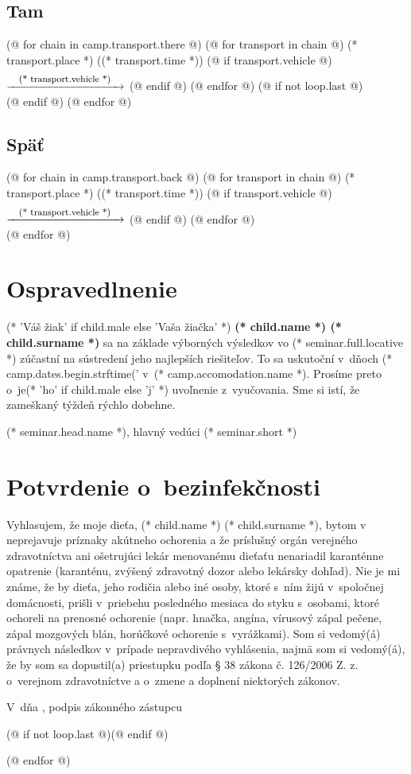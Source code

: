 \documentclass[12pt, twoside]{article}
\begin{document}
        \subsection{Tam}
        (@ for chain in camp.transport.there @)
            (@ for transport in chain @)
            (* transport.place *) ((* transport.time *)) (@ if transport.vehicle @) \quad$\xrightarrow{\raisebox{-4mm}{\footnotesize\text{\quad (* transport.vehicle *)\quad}}}$ \quad(@ endif @)
            (@ endfor @)%
            (@ if not loop.last @)\\(@ endif @)
        (@ endfor @)
        \subsection{Späť}
        (@ for chain in camp.transport.back @)
            (@ for transport in chain @)
            (* transport.place *) ((* transport.time *)) (@ if transport.vehicle @) \quad$\xrightarrow{\raisebox{-4mm}{\footnotesize\text{\quad (* transport.vehicle *)\quad}}}$ \quad(@ endif @)
            (@ endfor @)\\
        (@ endfor @)

    \cutHere
    \section{Ospravedlnenie}
        (* 'Váš žiak' if child.male else 'Vaša žiačka' *) \textbf{(* child.name *) (* child.surname *)} sa na základe výborných výsledkov vo (* seminar.full.locative *)
        zúčastní na sústredení jeho najlepších riešiteľov. To sa uskutoční v~dňoch (* camp.dates.begin.strftime('%
        v~(* camp.accomodation.name *). Prosíme preto o~je(* 'ho' if child.male else 'j' *) uvoľnenie z~vyučovania.
        Sme si istí, že zameškaný týždeň rýchlo dobehne.
        \vspace{5mm}

        \hfill (* seminar.head.name *), hlavný vedúci (* seminar.short *)
    
    \cutHere
    \section{Potvrdenie o~bezinfekčnosti}
    Vyhlasujem, že moje dieťa, (* child.name *) (* child.surname *), bytom v~\makebox[30mm]{\dotfill} neprejavuje príznaky akútneho ochorenia a že
        príslušný orgán verejného zdravotníctva ani ošetrujúci lekár menovanému dieťaťu nenariadil
        karanténne opatrenie (karanténu, zvýšený zdravotný dozor alebo lekársky dohľad). Nie je mi známe, že
        by dieťa, jeho rodičia alebo iné osoby, ktoré s~ním žijú v~spoločnej domácnosti, prišli v~priebehu
        posledného mesiaca do styku s~osobami, ktoré ochoreli na prenosné ochorenie (napr. hnačka, angína,
        vírusový zápal pečene, zápal mozgových blán, horúčkové ochorenie s~vyrážkami). Som si
        vedomý(á) právnych následkov v~prípade nepravdivého vyhlásenia, najmä som si vedomý(á), že by som sa
        dopustil(a) priestupku podľa § 38 zákona č. 126/2006 Z. z. o~verejnom zdravotníctve a o~zmene a
        doplnení niektorých zákonov.
        \vspace{5mm}

        V~\dotfill dňa \dotfill, \hfill podpis zákonného zástupcu \dotfill
        \vspace*{5mm}

    \cutHere
    (@ if not loop.last @)\newpage(@ endif @)

    (@ endfor @)
\end{document}
